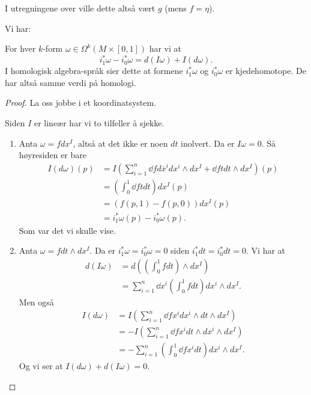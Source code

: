 \documentclass[11pt, english]{article}
\begin{document}
I utregningene over ville dette altså vært $g$ (mens $f=\eta$).

Vi har:

\begin{prop}
  For hver $k$-form $\omega \in \Omega^k(M \times [0,1])$ har vi at
\[
i_1^\ast  \omega - i_0^\ast \omega = d(I\omega) + I(d\omega).
\]
I homologisk algebra-språk sier dette at formene $i_1^\ast \omega$ og $i_0^\ast \omega$ er kjedehomotope. De har altså samme verdi på homologi.
\end{prop}

\begin{proof}
 La oss jobbe i et koordinatsystem.

Siden $I$ er lineær har vi to tilfeller å sjekke.
\begin{enumerate}
\item Anta $\omega = f dx^I$, altså at det ikke er noen $dt$ inolvert. Da er $I\omega = 0$. Så høyresiden er bare
\begin{align*}
I(d \omega)(p) &= I\left(\sum_{i=1}^n \dd{f}{d \overline x^i} dx^i \wedge dx^I + \dd{f}{t} dt \wedge dx^I \right)(p) \\
&= \left(\int_0^1 \dd{f}{t} dt  \right) dx^I(p) \\
&= (f(p,1)-f(p,0)) dx^I(p) \\
&= i_1^\ast \omega(p) - i_0^\ast \omega(p).
\end{align*}
Som var det vi skulle vise.
\item Anta $\omega = f dt \wedge dx^I$. Da er $i_1^\ast \omega=i_0^\ast \omega = 0$ siden $i_1^\ast dt = i_0^\ast dt = 0$. Vi har at
  \begin{align*}
d(I\omega) &= d((\int_0^1 f dt) \wedge dx^I) \\
&= \sum_{i=1}^n \dd{}{x^i} \left( \int_0^1 f   dt\right) dx^i \wedge dx^I.
  \end{align*}
Men også
\begin{align*}
I(d \omega) &= I(\sum_{i=1}^n \dd{f}{x^i} dx^i \wedge dt \wedge dx^I) \\
&= - I(\sum_{i=1}^n \dd{f}{x^i} dt \wedge  dx^i \wedge dx^I) \\
&= -\sum_{i=1}^n \left( \int_0^1 \dd{f}{x^i} dt\right) dx^i \wedge dx^I .
\end{align*}
Og vi ser at $I(d\omega) + d(I\omega) =0$.
\end{enumerate}
\end{proof}
\end{document}
